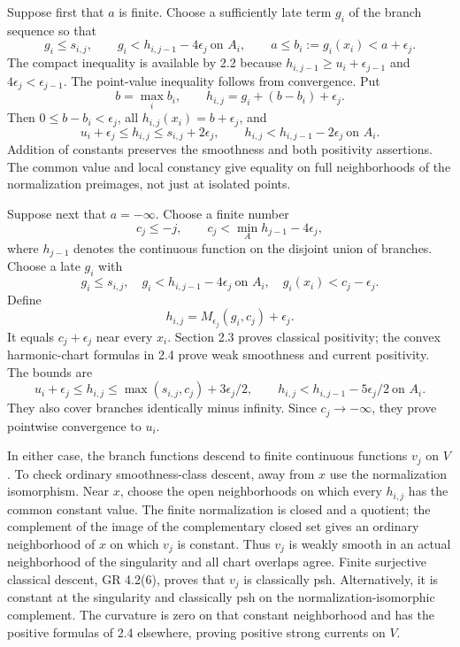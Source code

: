 \documentclass[11pt]{article}
\begin{document}
Suppose first that \(a\) is finite. Choose a sufficiently late term \(g_i\) of the branch sequence so that
\[
g_i\le s_{i,j},\qquad g_i<h_{i,j-1}-4\epsilon_j\ \text{on }A_i,
\qquad a\le b_i:=g_i(x_i)<a+\epsilon_j.
\]
The compact inequality is available by 2.2 because \(h_{i,j-1}\ge u_i+\epsilon_{j-1}\) and \(4\epsilon_j<\epsilon_{j-1}\). The point-value inequality follows from convergence. Put
\[
b=\max_i b_i,\qquad h_{i,j}=g_i+(b-b_i)+\epsilon_j.
\]
Then \(0\le b-b_i<\epsilon_j\), all \(h_{i,j}(x_i)=b+\epsilon_j\), and
\[
u_i+\epsilon_j\le h_{i,j}\le s_{i,j}+2\epsilon_j,
\qquad h_{i,j}<h_{i,j-1}-2\epsilon_j\ \text{on }A_i.
\]
Addition of constants preserves the smoothness and both positivity assertions. The common value and local constancy give equality on full neighborhoods of the normalization preimages, not just at isolated points.

Suppose next that \(a=-\infty\). Choose a finite number
\[
c_j\le-j,\qquad c_j<\min_A h_{j-1}-4\epsilon_j,
\]
where \(h_{j-1}\) denotes the continuous function on the disjoint union of branches. Choose a late \(g_i\) with
\[
g_i\le s_{i,j},\quad g_i<h_{i,j-1}-4\epsilon_j\ \text{on }A_i,
\quad g_i(x_i)<c_j-\epsilon_j.
\]
Define
\[
h_{i,j}=M_{\epsilon_j}(g_i,c_j)+\epsilon_j.
\]
It equals \(c_j+\epsilon_j\) near every \(x_i\). Section 2.3 proves classical positivity; the convex harmonic-chart formulas in 2.4 prove weak smoothness and current positivity. The bounds are
\[
u_i+\epsilon_j\le h_{i,j}\le\max(s_{i,j},c_j)+3\epsilon_j/2,
\qquad h_{i,j}<h_{i,j-1}-5\epsilon_j/2\ \text{on }A_i.
\]
They also cover branches identically minus infinity. Since \(c_j\to-\infty\), they prove pointwise convergence to \(u_i\).

In either case, the branch functions descend to finite continuous functions \(v_j\) on \(V\). To check ordinary smoothness-class descent, away from \(x\) use the normalization isomorphism. Near \(x\), choose the open neighborhoods on which every \(h_{i,j}\) has the common constant value. The finite normalization is closed and a quotient; the complement of the image of the complementary closed set gives an ordinary neighborhood of \(x\) on which \(v_j\) is constant. Thus \(v_j\) is weakly smooth in an actual neighborhood of the singularity and all chart overlaps agree. Finite surjective classical descent, GR 4.2(6), proves that \(v_j\) is classically psh. Alternatively, it is constant at the singularity and classically psh on the normalization-isomorphic complement. The curvature is zero on that constant neighborhood and has the positive formulas of 2.4 elsewhere, proving positive strong currents on \(V\).
\end{document}
